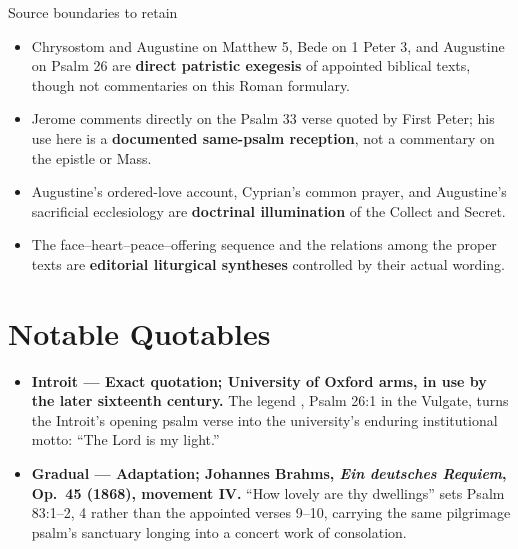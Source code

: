 \begin{deepstudy}
\begin{studybox}{Source boundaries to retain}
\begin{itemize}
\item Chrysostom and Augustine on Matthew 5, Bede on 1 Peter 3, and Augustine on Psalm 26 are \textbf{direct patristic exegesis} of appointed biblical texts, though not commentaries on this Roman formulary.
\item Jerome comments directly on the Psalm 33 verse quoted by First Peter; his use here is a \textbf{documented same-psalm reception}, not a commentary on the epistle or Mass.
\item Augustine's ordered-love account, Cyprian's common prayer, and Augustine's sacrificial ecclesiology are \textbf{doctrinal illumination} of the Collect and Secret.
\item The face--heart--peace--offering sequence and the relations among the proper texts are \textbf{editorial liturgical syntheses} controlled by their actual wording.
\end{itemize}
\end{studybox}

\sectionguard
\section*{Notable Quotables}
{\small
\begin{itemize}[itemsep=0em,topsep=0.15em,parsep=0pt]
\item \textbf{Introit --- Exact quotation; University of Oxford arms, in use by the later sixteenth century.} The legend , Psalm 26:1 in the Vulgate, turns the Introit's opening psalm verse into the university's enduring institutional motto: ``The Lord is my light.''
\item \textbf{Gradual --- Adaptation; Johannes Brahms, \emph{Ein deutsches Requiem}, Op.~45 (1868), movement IV.} ``How lovely are thy dwellings'' sets Psalm 83:1--2, 4 rather than the appointed verses 9--10, carrying the same pilgrimage psalm's sanctuary longing into a concert work of consolation.
\end{itemize}
}

\sectionguard

\end{deepstudy}
